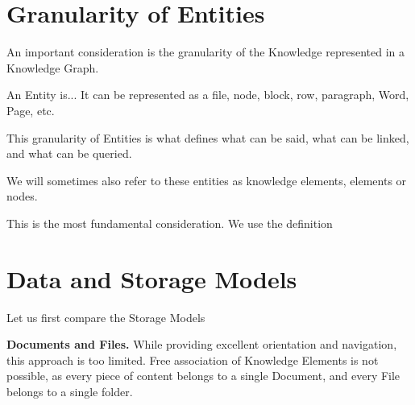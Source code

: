 \section{Granularity of Entities}

An important consideration is the granularity of the Knowledge represented in a Knowledge Graph. 

An Entity is... It can be represented as a file, node, block, row, paragraph, Word, Page, etc.

This granularity of Entities is what defines what can be said, what can be linked, and what can be queried.

We will sometimes also refer to these entities as knowledge elements, elements or nodes.

This is the most fundamental consideration. We use the definition  

\section{Data and Storage Models}





Let us first compare the Storage Models

\textbf{Documents and Files.} While providing excellent orientation and navigation, this approach is too limited. Free association of Knowledge Elements is not possible, as every piece of content belongs to a single Document, and every File belongs to a single folder.

